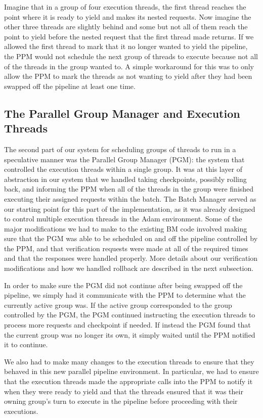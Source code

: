 \documentclass[11pt, oneside]{report}
\begin{document}
Imagine that in a group of four execution threads, the first thread reaches the point where it is ready to yield and makes its nested requests. Now imagine the other three threads are slightly behind and some but not all of them reach the point to yield before the nested request that the first thread made returns. If we allowed the first thread to mark that it no longer wanted to yield the pipeline, the PPM would not schedule the next group of threads to execute because not all of the threads in the group wanted to. A simple workaround for this was to only allow the PPM to mark the threads as not wanting to yield after they had been swapped off the pipeline at least one time.

\subsection{The Parallel Group Manager and Execution Threads}

The second part of our system for scheduling groups of threads to run in a speculative manner was the Parallel Group Manager (PGM): the system that controlled the execution threads within a single group. It was at this layer of abstraction in our system that we handled taking checkpoints, possibly rolling back, and informing the PPM when all of the threads in the group were finished executing their assigned requests within the batch. The Batch Manager served as our starting point for this part of the implementation, as it was already designed to control multiple execution threads in the Adam environment. Some of the major modifications we had to make to the existing BM code involved making sure that the PGM was able to be scheduled on and off the pipeline controlled by the PPM, and that verification requests were made at all of the required times and that the responses were handled properly. More details about our verification modifications and how we handled rollback are described in the next subsection. 

In order to make sure the PGM did not continue after being swapped off the pipeline, we simply had it communicate with the PPM to determine what the currently active group was. If the active group corresponded to the group controlled by the PGM, the PGM continued instructing the execution threads to process more requests and checkpoint if needed. If instead the PGM found that the current group was no longer its own, it simply waited until the PPM notified it to continue.

We also had to make many changes to the execution threads to ensure that they behaved in this new parallel pipeline environment. In particular, we had to ensure that the execution threads made the appropriate calls into the PPM to notify it when they were ready to yield and that the threads ensured that it was their owning group's turn to execute in the pipeline before proceeding with their executions.
\end{document}
